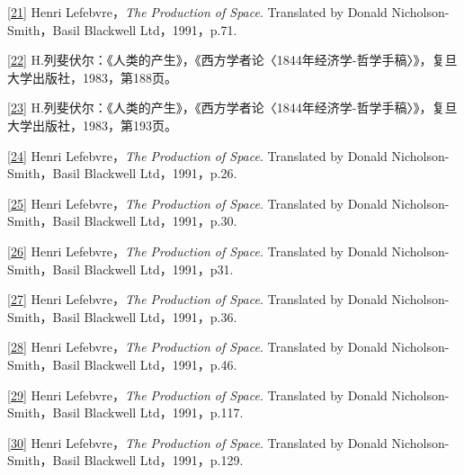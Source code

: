 \documentclass[UTF8, fontset = sourcesans, a4paper, oneside, zihao =
-4, scheme=chinese, no-math, space=true]{ctexbook}
\begin{document}
\protect\hypertarget{part0006_split_003.htmlux5cux23m21}{}{}\protect\hyperlink{part0006_split_002.htmlux5cux23w21}{{[}21{]}}
Henri Lefebvre，\emph{The Production of Space}. Translated by Donald
Nicholson-Smith，Basil Blackwell Ltd，1991，p.71.

\protect\hypertarget{part0006_split_003.htmlux5cux23m22}{}{}\protect\hyperlink{part0006_split_002.htmlux5cux23w22}{{[}22{]}}
H.列斐伏尔：《人类的产生》，《西方学者论〈1844年经济学-哲学手稿〉》，复旦大学出版社，1983，第188页。

\protect\hypertarget{part0006_split_003.htmlux5cux23m23}{}{}\protect\hyperlink{part0006_split_002.htmlux5cux23w23}{{[}23{]}}
H.列斐伏尔：《人类的产生》，《西方学者论〈1844年经济学-哲学手稿〉》，复旦大学出版社，1983，第193页。

\protect\hypertarget{part0006_split_003.htmlux5cux23m24}{}{}\protect\hyperlink{part0006_split_002.htmlux5cux23w24}{{[}24{]}}
Henri Lefebvre，\emph{The Production of Space}. Translated by Donald
Nicholson-Smith，Basil Blackwell Ltd，1991，p.26.

\protect\hypertarget{part0006_split_003.htmlux5cux23m25}{}{}\protect\hyperlink{part0006_split_002.htmlux5cux23w25}{{[}25{]}}
Henri Lefebvre，\emph{The Production of Space}. Translated by Donald
Nicholson-Smith，Basil Blackwell Ltd，1991，p.30.

\protect\hypertarget{part0006_split_003.htmlux5cux23m26}{}{}\protect\hyperlink{part0006_split_002.htmlux5cux23w26}{{[}26{]}}
Henri Lefebvre，\emph{The Production of Space}. Translated by Donald
Nicholson-Smith，Basil Blackwell Ltd，1991，p31.

\protect\hypertarget{part0006_split_003.htmlux5cux23m27}{}{}\protect\hyperlink{part0006_split_002.htmlux5cux23w27}{{[}27{]}}
Henri Lefebvre，\emph{The Production of Space}. Translated by Donald
Nicholson-Smith，Basil Blackwell Ltd，1991，p.36.

\protect\hypertarget{part0006_split_003.htmlux5cux23m28}{}{}\protect\hyperlink{part0006_split_002.htmlux5cux23w28}{{[}28{]}}
Henri Lefebvre，\emph{The Production of Space}. Translated by Donald
Nicholson-Smith，Basil Blackwell Ltd，1991，p.46.

\protect\hypertarget{part0006_split_003.htmlux5cux23m29}{}{}\protect\hyperlink{part0006_split_002.htmlux5cux23w29}{{[}29{]}}
Henri Lefebvre，\emph{The Production of Space}. Translated by Donald
Nicholson-Smith，Basil Blackwell Ltd，1991，p.117.

\protect\hypertarget{part0006_split_003.htmlux5cux23m30}{}{}\protect\hyperlink{part0006_split_002.htmlux5cux23w30}{{[}30{]}}
Henri Lefebvre，\emph{The Production of Space}. Translated by Donald
Nicholson-Smith，Basil Blackwell Ltd，1991，p.129.
\end{document}
